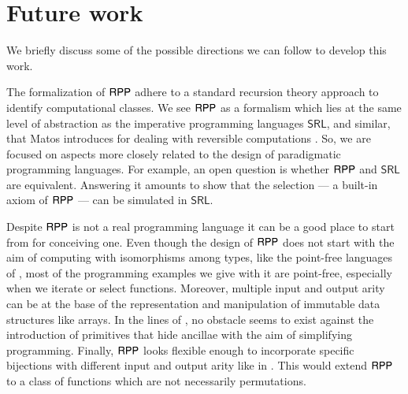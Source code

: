 \section{Future work}
\label{section:Related and future work}
We briefly discuss some of the possible directions we can follow to develop this work.

The formalization of $ \mathsf{RPP} $ adhere to a standard recursion theory approach to identify computational classes.
We see $ \mathsf{RPP} $ as a formalism which lies at the same level of abstraction as the imperative programming languages
$ \mathsf{SRL}$, and similar, that Matos introduces for dealing with reversible computations \cite{matos03tcs,matos2016notes}.
So, we are focused on aspects more closely related to the design of paradigmatic programming languages. 
For example, an open question is whether $ \mathsf{RPP} $ and $ \mathsf{SRL} $ are equivalent.
Answering it amounts to show that the selection --- a built-in axiom of $ \mathsf{RPP} $ --- can be simulated in $ \mathsf{SRL} $.

Despite $ \mathsf{RPP} $ is not a real programming language it can be a good place to start from for conceiving one. 
Even though the design of $ \mathsf{RPP} $ does not start with the aim of computing with isomorphisms among types,
like the point-free languages of \cite{James2014TheseusAH,10.1007/978-3-540-27764-4_16}, most of the programming examples 
we give with it are point-free, especially when we iterate or select functions. 
Moreover, multiple input and output arity can be at the base of the representation and manipulation of immutable data structures 
like arrays. In the lines of \cite{thomsen2015lncs}, no obstacle seems to exist against the introduction of primitives that 
hide ancillae with the aim of simplifying programming.
Finally, $ \mathsf{RPP} $ looks flexible enough to incorporate specific bijections with different input and output arity
like in \cite{DBLP:conf/rc/YokoyamaAG11}. This would extend $ \mathsf{RPP} $ to a class of functions which are not necessarily 
permutations.


